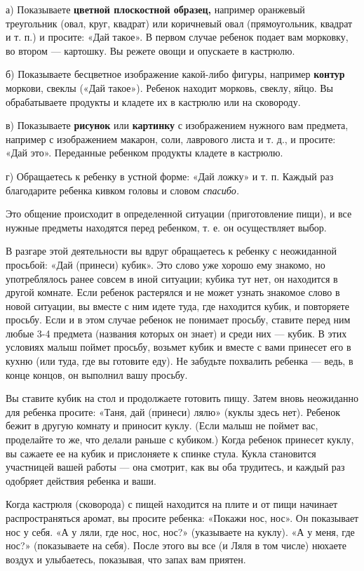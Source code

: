 \documentclass[a5paper]{book}
\renewcommand{\emph}[1]{\textit{#1}}
\begin{document}
а) Показываете \textbf{цветной плоскостной образец,} например оранжевый
треугольник (овал, круг, квадрат) или коричневый овал (прямоугольник,
квадрат и т. п.) и просите: «Дай такое». В первом случае ребенок подает
вам морковку, во втором --- картошку. Вы режете овощи и опускаете в
кастрюлю.

б) Показываете бесцветное изображение какой-либо фигуры, например
\textbf{контур} моркови, свеклы («Дай такое»). Ребенок находит морковь,
свеклу, яйцо. Вы обрабатываете продукты и кладете их в кастрюлю или на
сковороду.

в) Показываете \textbf{рисунок} или \textbf{картинку} с изображением
нужного вам предмета, например с изображением макарон, соли, лаврового
листа и т. д., и просите: «Дай это». Переданные ребенком продукты
кладете в кастрюлю.

г) Обращаетесь к ребенку в устной форме: «Дай ложку» и т. п. Каждый раз
благодарите ребенка кивком головы и словом \emph{спасибо.}

Это общение происходит в определенной ситуации (приготовление пищи), и
все нужные предметы находятся перед ребенком, т. е. он осуществляет
выбор.

В разгаре этой деятельности вы вдруг обращаетесь к ребенку с неожиданной
просьбой: «Дай (принеси) кубик». Это слово уже хорошо ему знакомо, но
употреблялось ранее совсем в иной ситуации; кубика тут нет, он находится
в другой комнате. Если ребенок растерялся и не может узнать знакомое
слово в новой ситуации, вы вместе с ним идете туда, где находится кубик,
и повторяете просьбу. Если и в этом случае ребенок не понимает просьбу,
ставите перед ним любые 3-4 предмета (названия которых он знает) и среди
них --- кубик. В этих условиях малыш поймет просьбу, возьмет кубик и
вместе с вами принесет его в кухню (или туда, где вы готовите еду). Не
забудьте похвалить ребенка --- ведь, в конце концов, он выполнил вашу
просьбу.

Вы ставите кубик на стол и продолжаете готовить пищу. Затем вновь
неожиданно для ребенка просите: «Таня, дай (принеси) лялю» (куклы здесь
нет). Ребенок бежит в другую комнату и приносит куклу. (Если малыш не
поймет вас, проделайте то же, что делали раньше с кубиком.) Когда
ребенок принесет куклу, вы сажаете ее на кубик и прислоняете к спинке
стула. Кукла становится участницей вашей работы --- она смотрит, как вы
оба трудитесь, и каждый раз одобряет действия ребенка и ваши.

Когда кастрюля (сковорода) с пищей находится на плите и от пищи начинает
распространяться аромат, вы просите ребенка: «Покажи нос, нос». Он
показывает нос у себя. «А у ляли, где нос, нос, нос?» (указываете на
куклу). «А у меня, где нос?» (показываете на себя). После этого вы все
(и Ляля в том числе) нюхаете воздух и улыбаетесь, показывая, что запах
вам приятен.
\end{document}
